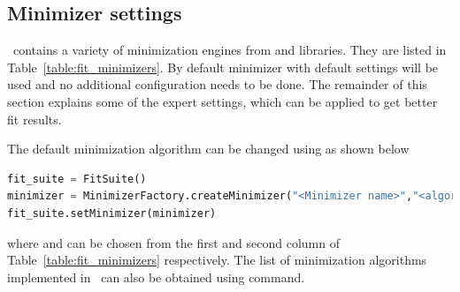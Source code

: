 \subsection{Minimizer settings}

\BornAgain\ contains a variety of minimization engines from  and 
libraries. They are listed in Table~\ref{table:fit_minimizers}.
By default  minimizer with default settings will be used and no additional
configuration needs to be done.
The remainder of this section explains some of the expert settings, which can be applied to get better
fit results.

The default minimization algorithm can be changed using
 as shown below
\begin{lstlisting}[language=python, style=eclipseboxed,numbers=none]
fit_suite = FitSuite()
minimizer = MinimizerFactory.createMinimizer("<Minimizer name>","<algorithm>")
fit_suite.setMinimizer(minimizer)
\end{lstlisting}

where  and  can be chosen from the first and
second column of Table~\ref{table:fit_minimizers} respectively.
The list of minimization algorithms implemented in \BornAgain\
can also be obtained using  command.


